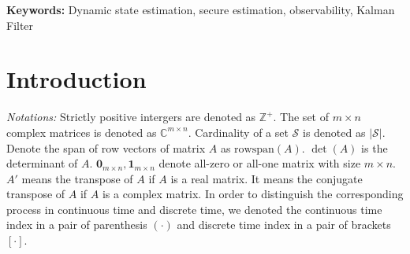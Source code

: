 \documentclass[12pt]{article}
\newcommand{\Cb}{{\mathbb{C}}}
\newcommand{\Zb}{{\mathbb{Z}}}
\newcommand{\I}{{\mathcal{I}}}
\newcommand{\Sc}{{\mathcal{S}}}
\newcommand{\rs}{\text{rowspan}}
\begin{document}






\maketitle

\begin{abstract}
...
\end{abstract}

\textbf{Keywords:}
Dynamic state estimation, secure estimation, observability, Kalman Filter







%



\section{Introduction}

\textit{Notations:}
Strictly positive intergers are denoted as $\Zb^+$. The set of $m\times n$ complex matrices is denoted as $\Cb^{m\times n}$.
Cardinality of a set $\Sc$ is denoted as $|\Sc|$.  Denote the span of row vectors of matrix $A$ as $\rs(A)$. $\det(A)$ is the determinant of $A$. $\mathbf{0}_{m\times n}, \mathbf{1}_{m\times n}$ denote all-zero or all-one matrix with size $m\times n$.
$A{'}$ means the transpose of $A$ if $A$ is a real matrix. It means the conjugate transpose of $A$ if $A$ is a complex matrix.
In order to distinguish the corresponding process in continuous time and discrete time, we denoted the continuous time index in a pair of parenthesis $(\cdot)$ and discrete time index in a pair of brackets $[\cdot]$.
\end{document}
